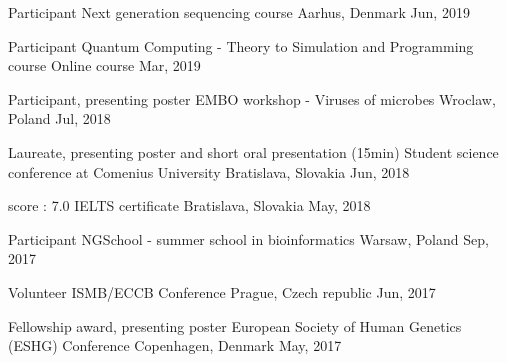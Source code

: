 
\begin{cventries}

    \cventry
        {Participant}
        {Next generation sequencing course}
        {Aarhus, Denmark}
        {Jun, 2019}
        {}

    \cventry
        {Participant} %
        {Quantum Computing - Theory to Simulation and Programming course} %
        {Online course} %
        {Mar, 2019} %
        {}

    \cventry
        {Participant, presenting poster}
        {EMBO workshop - Viruses of microbes}
        {Wroclaw, Poland}
        {Jul, 2018}
        {}
    
    \cventry
        {Laureate, presenting poster and short oral presentation (15min)} %
        {Student science conference at Comenius University} %
        {Bratislava, Slovakia} %
        {Jun, 2018} %
        {}
  
    \cventry
        {score : 7.0}
        {IELTS certificate}
        {Bratislava, Slovakia}
        {May, 2018}
        {}
    
    \cventry
        {Participant} %
        {NGSchool - summer school in bioinformatics} %
        {Warsaw, Poland} %
        {Sep, 2017} %
        {}

    \cventry
        {Volunteer} %
        {ISMB/ECCB Conference} %
        {Prague, Czech republic} %
        {Jun, 2017} %
        {}

    \cventry
        {Fellowship award, presenting poster} %
        {European Society of Human Genetics (ESHG) Conference} %
        {Copenhagen, Denmark} %
        {May, 2017} %
        {}
    

\end{cventries}
